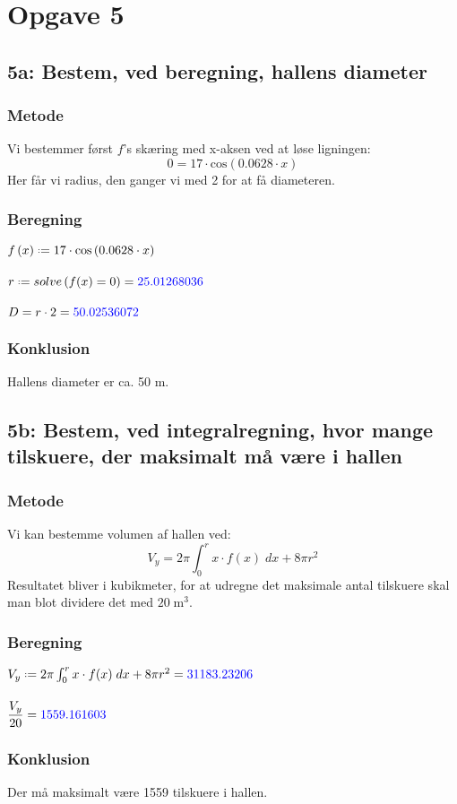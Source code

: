 \documentclass[../main.tex]{subfiles}
\begin{document}
\section*{Opgave 5}
\subsection*{5a: Bestem, ved beregning, hallens diameter}
    \subsubsection*{Metode}
        Vi bestemmer først \(f\)'s skæring med x-aksen ved at løse ligningen:
        \[0=17\cdot \text{cos}(0.0628\cdot x)\]
        Her får vi radius, den ganger vi med 2 for at få diameteren.
    \subsubsection*{Beregning}
    \(f\left(x\right)\defeq 17\cdot \cos\left( 0.0628\cdot x\right)\)\\\\
        \(r \defeq solve\left(f(x)=0\right) = \textcolor{blue}{25.01268036}\)\\\\
        \(D = r \cdot 2 = \textcolor{blue}{50.02536072}\)
    \subsubsection*{Konklusion}
        Hallens diameter er ca. 50 m.
\vspace*{1.7 cm}
\subsection*{5b: Bestem, ved integralregning, hvor mange tilskuere, der maksimalt må være i hallen}
    \subsubsection*{Metode}
        Vi kan bestemme volumen af hallen ved:
        \[\displaystyle V_y = 2 \pi \int _0 ^r x\cdot f(x) \; dx + 8\pi r^2\]
        Resultatet bliver i kubikmeter, for at udregne det maksimale antal tilskuere skal man blot dividere det med \(20\; \text{m}^3\).
    \subsubsection*{Beregning}
    \(V_y \defeq 2 \pi \int _0 ^r x\cdot f(x) \; dx + 8\pi r^2 = \textcolor{blue}{31183.23206}\)\\\\
    \(\displaystyle \frac{V_y}{20}=\textcolor{blue}{1559.161603}\)
    \subsubsection*{Konklusion}
    Der må maksimalt være 1559 tilskuere i hallen.
\end{document}
